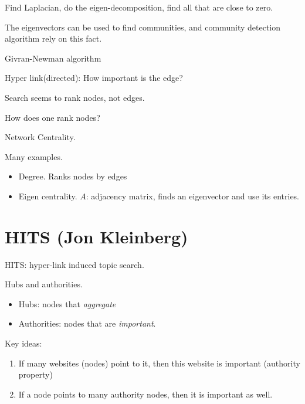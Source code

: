 \begin{definition}
	Find Laplacian, do the eigen-decomposition, find all that are close to zero.
\end{definition}

The eigenvectors can be used to find communities, and community detection algorithm rely on this fact.

\begin{prev}
	Givran-Newman algorithm
\end{prev}
\begin{problem}
Hyper link(directed): How important is the edge?
\end{problem}
\begin{answer}
	Search seems to rank nodes, not edges.
\end{answer}

\begin{problem}
How does one rank nodes?
\end{problem}
\begin{answer}
	Network Centrality.
\end{answer}

\begin{eg}
	Many examples.
	\begin{itemize}
		\item Degree. Ranks nodes by edges
		\item Eigen centrality. \(A\): adjacency matrix, finds an eigenvector and use its entries.
	\end{itemize}
\end{eg}

\chapter{HITS (Jon Kleinberg)}
HITS: hyper-link induced topic search.

Hubs and authorities.
\begin{itemize}
	\item Hubs: nodes that \emph{aggregate}
	\item Authorities: nodes that are \emph{important}.
\end{itemize}

Key ideas:
\begin{enumerate}
	\item If many websites (nodes) point to it, then this website is important (authority property)
	\item If a node points to many authority nodes, then it is important as well.
\end{enumerate}

